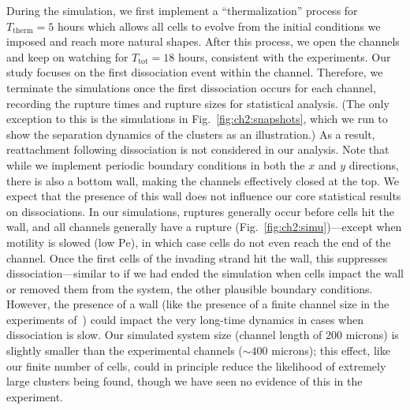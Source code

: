 During the simulation, we first implement a ``thermalization'' process for $T_\textrm{therm}=5$ hours which allows all cells to evolve from the initial conditions we imposed and reach more natural shapes.
After this process, we open the channels and keep on watching for $T_{\textrm{tot}}=18$ hours, consistent with the experiments.
Our study focuses on the first dissociation event within the channel.
Therefore, we terminate the simulations once the first dissociation occurs for each channel, recording the rupture times and rupture sizes for statistical analysis.
(The only exception to this is the simulations in Fig.~\ref{fig:ch2:snapshots}, which we run to show the separation dynamics of the clusters as an illustration.)
As a result, reattachment following dissociation is not considered in our analysis.
Note that while we implement periodic boundary conditions in both the $x$ and $y$ directions, there is also a bottom wall, making the channels effectively closed at the top.
We expect that the presence of this wall does not influence our core statistical results on dissociations.
In our simulations, ruptures generally occur before cells hit the wall, and all channels generally have a rupture (Fig.~\ref{fig:ch2:simu})---except when motility is slowed (low $\textrm{Pe}$), in which case cells do not even reach the end of the channel.
Once the first cells of the invading strand hit the wall, this suppresses dissociation---similar to if we had ended the simulation when cells impact the wall or removed them from the system, the other plausible boundary conditions.
However, the presence of a wall (like the presence of a finite channel size in the experiments of~\cite{law2023cytokinesis}) could impact the very long-time dynamics in cases when dissociation is slow.
Our simulated system size (channel length of $200$ microns) is slightly smaller than the experimental channels ($\sim 400$ microns); this effect, like our finite number of cells, could in principle reduce the likelihood of extremely large clusters being found, though we have seen no evidence of this in the experiment.

